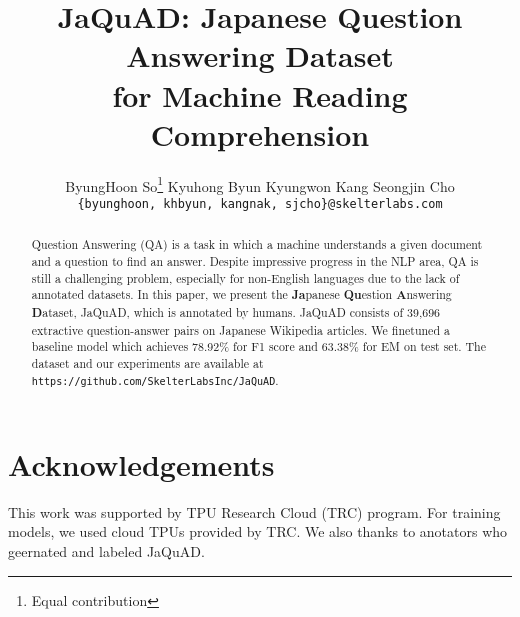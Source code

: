 \documentclass{article}
\title{JaQuAD: Japanese Question Answering Dataset \\ for Machine Reading Comprehension}
\author{
    ByungHoon So\thanks{Equal contribution}\qquad
    Kyuhong Byun\printfnsymbol{1}\qquad
    Kyungwon Kang\qquad
    Seongjin Cho\\
    \texttt{\{byunghoon, khbyun, kangnak, sjcho\}@skelterlabs.com}
}
\date{}
\begin{document}
\maketitle

\begin{abstract}
Question Answering (QA) is a task in which a machine understands a given document and a question to find an answer.
Despite impressive progress in the NLP area, QA is still a challenging problem, especially for non-English languages due to the lack of annotated datasets.
In this paper, we present the \textbf{Ja}panese \textbf{Qu}estion \textbf{A}nswering \textbf{D}ataset, JaQuAD, which is annotated by humans.
JaQuAD consists of 39,696 extractive question-answer pairs on Japanese Wikipedia articles.
We finetuned a baseline model which achieves 78.92\% for F1 score and 63.38\% for EM on test set.
The dataset and our experiments are available at \texttt{https://github.com/SkelterLabsInc/JaQuAD}.
\end{abstract}









\section{Acknowledgements}
This work was supported by TPU Research Cloud (TRC) program.
For training models, we used cloud TPUs provided by TRC.
We also thanks to anotators who geernated and labeled JaQuAD.






\end{document}
